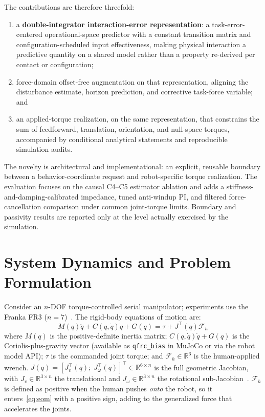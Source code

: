 \documentclass[journal]{IEEEtran}
\begin{document}
The contributions are therefore threefold:

\begin{enumerate}[leftmargin=*,itemsep=2pt,topsep=2pt]
\item a \textbf{double-integrator interaction-error representation}: a
task-error-centered operational-space predictor with a constant transition
matrix and configuration-scheduled input effectiveness, making physical
interaction a predictive quantity on a shared model rather than a property
re-derived per contact or configuration;
\item force-domain offset-free augmentation on that representation, aligning
the disturbance estimate, horizon prediction, and corrective task-force
variable; and
\item an applied-torque realization, on the same representation, that
constrains the sum of feedforward, translation, orientation, and null-space
torques, accompanied by conditional analytical statements and reproducible
simulation audits.
\end{enumerate}

The novelty is architectural and implementational: an explicit, reusable
boundary between a behavior-coordinate request and robot-specific torque
realization.  The evaluation
focuses on the causal C4--C5 estimator ablation and adds a
stiffness-and-damping-calibrated impedance, tuned anti-windup PI, and filtered force-cancellation comparison
under common joint-torque limits.  Boundary and passivity results are reported
only at the level actually exercised by the simulation.

\section{System Dynamics and Problem Formulation}

Consider an $n$-DOF torque-controlled serial manipulator; experiments
use the Franka FR3 ($n=7$)~\cite{franka2023fr3}.
The rigid-body equations of motion are:
\begin{equation}\label{eq:eom}
  M(q)\ddot{q}+C(q,\dot{q})\dot{q}+G(q)=\tau+J^\top(q)\mathcal{F}_h
\end{equation}
where $M(q)$ is the positive-definite inertia matrix;
$C(q,\dot{q})\dot{q}+G(q)$ is the Coriolis-plus-gravity vector
(available as \texttt{qfrc\_bias} in MuJoCo or via the robot model API);
$\tau$ is the commanded joint torque; and $\mathcal{F}_h\in\mathbb{R}^6$
is the human-applied wrench.
$J(q)=[J_v^\top(q);\;J_\omega^\top(q)]^\top\in\mathbb{R}^{6\times n}$
is the full geometric Jacobian, with $J_v\in\mathbb{R}^{3\times n}$ the
translational and $J_\omega\in\mathbb{R}^{3\times n}$ the rotational
sub-Jacobian~\cite{siciliano2009robotics}.
$\mathcal{F}_h$ is defined as positive when the human pushes
\emph{onto} the robot, so it enters~\eqref{eq:eom} with a positive
sign, adding to the generalized force that accelerates the joints.
\end{document}
